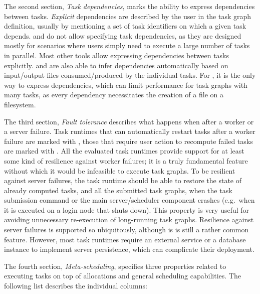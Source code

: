 The second section, \emph{Task dependencies}, marks the ability to express dependencies between
tasks. \emph{Explicit} dependencies are described by the user in the task graph definition,
usually by mentioning a set of task identifiers on which a given task depends.
\gnuparallel{} and \hypershell{} do not allow specifying task dependencies, as
they are designed mostly for scenarios where users simply need to execute a large number of tasks
in parallel. Most other tools allow expressing dependencies between tasks explicitly.
\pegasus{} and \snakemake{} are also able to infer dependencies
automatically based on input/output files consumed/produced by the individual tasks. For
\snakemake{}, it is the only way to express dependencies, which can limit performance
for task graphs with many tasks, as every dependency necessitates the creation of a file on a
filesystem.

The third section, \emph{Fault tolerance} describes what happens when after a worker or a server
failure. Task runtimes that can automatically restart tasks after a worker failure are marked with
\automaticft, those that require user action to recompute failed tasks are marked with \manualft.
All the evaluated task runtimes provide support for at least some kind of resilience against worker
failures; it is a truly fundamental feature without which it would be infeasible to execute task
graphs. To be resilient against server failures, the task runtime should be able to restore the
state of already computed tasks, and all the submitted task graphs, when the task submission
command or the main server/scheduler component crashes (e.g.\ when it is executed on a login node
that shuts down). This property is very useful for avoiding unnecessary re-execution of
long-running task graphs. Resilience against server failures is supported so ubiquitously, although
is is still a rather common feature. However, most task runtimes require an external service or a
database instance to implement server persistence, which can complicate their deployment.

The fourth section, \emph{Meta-scheduling}, specifies three properties related to executing tasks
on top of allocations and general scheduling capabilities. The following list describes the
individual columns:


